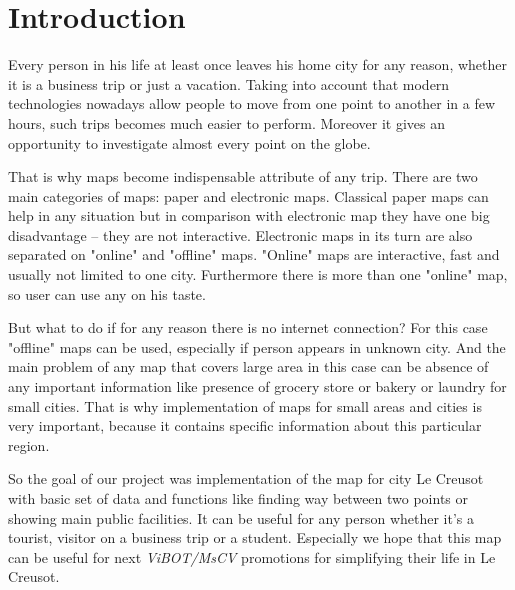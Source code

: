
\chapter{Introduction} %

\label{Chapter1} %


Every person in his life at least once leaves his home city for any reason, whether it is a business trip or just a vacation. Taking into account that modern technologies nowadays allow people to move from one point to another in a few hours, such trips becomes much easier to perform. Moreover it gives an opportunity to investigate almost every point on the globe. 

That is why maps become indispensable attribute of any trip. There are two main categories of maps: paper and electronic maps. Classical paper maps can help in any situation but in comparison with electronic map they have one big disadvantage – they are not interactive. Electronic maps in its turn are also separated on "online" and "offline" maps. "Online" maps are interactive, fast and usually not limited to one city. Furthermore there is more than one "online" map, so user can use any on his taste. 

But what to do if for any reason there is no internet connection? For this case "offline" maps can be used, especially if person appears in unknown city. And the main problem of any map that covers large area in this case can be absence of any important information like presence of grocery store or bakery or laundry for small cities. That is why implementation of maps for small areas and cities is very important, because it contains specific information about this particular region.

So the goal of our project was implementation of the map for city Le Creusot with basic set of data and functions like finding way between two points or showing main public facilities. It can be useful for any person whether it's a tourist, visitor on a business trip or a student. Especially we hope that this map can be useful for next \textit{ViBOT/MsCV} promotions for simplifying their life in Le Creusot.
